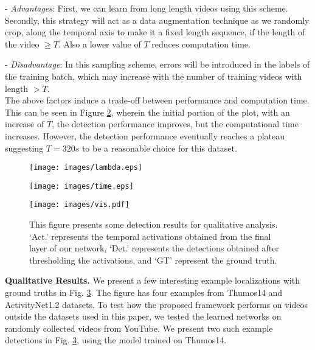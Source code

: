 \documentclass[runningheads]{llncs}
\begin{document}
\noindent
- \textit{Advantages}: First, we can learn from long length videos using this scheme. Secondly, this strategy will act as a data augmentation technique as we randomly crop, along the temporal axis to make it a fixed length sequence, if the length of the video $\geq T$. Also a lower value of $T$ reduces computation time.

\noindent
- \textit{Disadvantage}: In this sampling scheme, errors will be introduced in the labels of the training batch, which may increase with the number of training videos with length $> T$. \\
The above factors induce a trade-off between performance and computation time. This can be seen in Figure \ref{time}, wherein the initial portion of the plot, with an increase of $T$, the detection performance improves, but the computational time increases. However, the detection performance eventually reaches a plateau suggesting $T=320 s$ to be a reasonable choice for this dataset.

\begin{figure*}
	\centering
	\begin{subfigure}{0.48\textwidth}
		\texttt{[image: images/lambda.eps]}
		\caption{}
		\label{lambda}
	\end{subfigure}
	\begin{subfigure}{0.48\textwidth}
		\texttt{[image: images/time.eps]}
		\caption{}
		\label{time}
	\end{subfigure}
	\caption{(a) presents the variations in detection performance on Thumos14 by changing weights on MILL and CASL. Higher $\lambda$ represents more weight on the MILL and vice versa. (b) presents the variations in detection performance ($@ \text{IoU} \geq 0.3$) and training time on Thumos14 dataset by changing the maximum possible length of video sequence during training ($T$) as discussed in the text.}
	\label{expanalysis}
\end{figure*}

\begin{figure}[!t]
	\centering
\texttt{[image: images/vis.pdf]}
	\caption{This figure presents some detection results for qualitative analysis. `Act.' represents the temporal activations obtained from the final layer of our network, `Det.' represents the detections obtained after thresholding the activations, and `GT' represent the ground truth. }
	\label{vis}
\end{figure}

\textbf{Qualitative Results.} We present a few interesting example localizations with ground truths in Fig. \ref{vis}. The figure has four examples from Thumos14 and ActivityNet1.2 datasets. To test how the proposed framework performs on videos outside the datasets used in this paper, we tested the learned networks on randomly collected videos from YouTube. We present two such example detections in Fig. \ref{vis}, using the model trained on Thumos14. 
\end{document}
